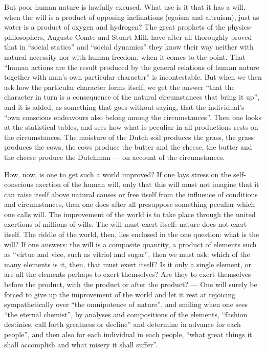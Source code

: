 \documentclass[12pt,a4paper,openany]{book}
\newcommand{\opage}[1]{\marginnote{\footnotesize\textit{[#1]}}}
\begin{document}
But poor human nature is lawfully excused.
What use is it that it has a will,
when the will is a product of opposing inclinations
(egoism and altruism), just as water is a
product of oxygen and hydrogen? The great prophets of the physics-philosophers,
Auguste Comte and Stuart Mill, have after all thoroughly
proved that in ``social statics'' and ``social dynamics''
they know their way neither with
\setcounter{footnote}{0}%
\opage{88}natural necessity nor with human freedom, when it comes
to the point. That ``human actions are the
result produced by the general relations of human nature
together with man's own particular character''
is incontestable. But when we then ask how
the particular character forms itself, we get the
answer ``that the character in turn is a consequence of the natural
circumstances that bring it up'', and it is added,
as something that goes without saying, that the individual's
``own conscious endeavours also belong among the circumstances''.
Then one looks at the statistical tables,
and sees how what is peculiar in all
productions rests on the circumstances. The moisture
of the Dutch soil produces the grass,
the grass produces the cows, the cows produce the butter
and the cheese, the butter and the cheese produce the Dutchman ---
on account of the circumstances.

How, now, is one to get such a world improved?
If one lays stress on the self-conscious exertion of the human
will, only that this will
must not imagine that it can raise itself above
natural causes or free itself from the influence of conditions and
circumstances, then one does after all presuppose
something peculiar which one calls will. The improvement of the world
is to take place through the united exertions of millions of wills.
The will must exert itself: nature does not
exert itself. The riddle of the world, then, lies enclosed
in the one question: what is the will? If one answers:
the will is a composite quantity, a product of elements
such as ``virtue and vice, such as vitriol and sugar'', then
we must ask: which of the many elements is it, then,
that must exert itself? Is it only a single
\setcounter{footnote}{0}%
\opage{89}element, or are all the elements perhaps to exert
themselves? Are they to exert themselves before the product, with the product
or after the product? --- One will surely be
forced to give up the improvement of the world and let it
rest at rejoicing sympathetically over ``the omnipotence
of nature'', and smiling when one sees ``the eternal
chemist'', by analyses and compositions of the elements,
``fashion destinies, call forth greatness or
decline'' and determine in advance for each people'', and then also
for each individual in each people, ``what great things it shall accomplish
and what misery it shall suffer''.
\end{document}
